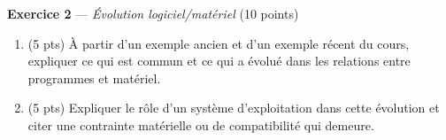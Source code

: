 \textbf{Exercice 2} --- \textit{Évolution logiciel/matériel} \hfill (10 points)

\begin{enumerate}
  \item (5 pts) À partir d'un exemple ancien et d'un exemple récent du cours,
    expliquer ce qui est commun et ce qui a évolué dans les relations entre
    programmes et matériel.
  \item (5 pts) Expliquer le rôle d'un système d'exploitation dans cette
    évolution et citer une contrainte matérielle ou de compatibilité qui
    demeure.
\end{enumerate}

